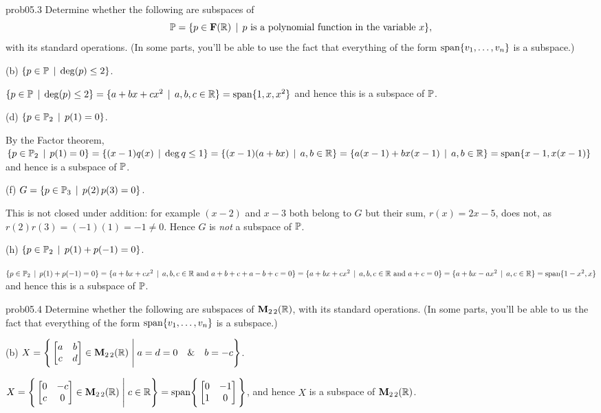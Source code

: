 \begin{sol}{prob05.3} Determine whether   the following are subspaces of $$\mathbb{P} =\{p \in \mathbf{F}(\mathbb{R})   \,\mid \, p \text{ is a polynomial function in the variable } x \},$$ with its standard operations. (In some parts, you'll be able to use the fact that everything of the form $\textrm{span}\{v_1, \dots, v_n\}$  is a subspace.)
 
\medskip
 

(b) $\{p \in \mathbb{P}   \,\mid \, \deg(p)
\le 2  \}$. 

\soln $\{p \in \mathbb{P}   \,\mid \, \deg(p)
\le 2  \}= \{a +bx +cx^2   \,\mid \, a,b,c\in \mathbb{R} \}=\textrm{span}\{1, x, x^2\}$  and hence this is a subspace of $\mathbb{P}$.\medskip 
% 

 
 

(d)  $ \{p \in \mathbb{P}_2 \,\mid \,  p(1)=0 \}$. 

\soln By the Factor theorem, $ \{p \in \mathbb{P}_2 \,\mid \,  p(1)=0 \}=\{(x-1)q(x)\,\mid \, \deg q \le 1 \}=\{(x-1)(a+bx) \,\mid \, a,b \in \mathbb{R} \}=\{a(x-1)+ bx(x-1) \,\mid \, a,b \in \mathbb{R} \}=\textrm{span}\{x-1, x(x-1)\}$ and hence is  a subspace of $\mathbb{P}$. \medskip
%



(f) $G=\{p \in \mathbb{P}_3 \,\mid \,  p(2)\,p(3)=0 \}$. 

\soln This is not closed under addition: for example $(x-2)$ and $x-3$ both belong to $G$ but their sum, $r(x)=2x-5$, does not, as $r(2)r(3)=(-1)(1)=-1\not=0$. Hence $G$ is {\it not}  a subspace of $\mathbb{P}$.\medskip
%

(h) $ \{p \in \mathbb{P}_2 \,\mid \,  p(1)+p(-1)=0 \}$. 

\soln   $ \{p \in \mathbb{P}_2 \,\mid \,  p(1)+p(-1)=0 \}=\{a+bx +cx^2  \,\mid \,  a,b,c \in \mathbb{R} \text{ and } a+b+c+a-b+c=0 \}=\{a+bx +cx^2  \,\mid \,  a,b,c \in \mathbb{R} \text{ and } a+c=0 \}=\{a +bx -ax^2  \,\mid \,  a, c \in \mathbb{R} \}=\textrm{span}\{1- x^2, x\}$ and hence this is   a subspace of $\mathbb{P}$.\medskip
%

 
\end{sol}\begin{sol}{prob05.4} Determine whether   the following are subspaces of $\mathbf{M}_{2 \,2}(\mathbb{R})$, with its standard operations. (In some parts, you'll be able to us the fact that everything of the form $\textrm{span}\{v_1, \dots, v_n\}$  is a subspace.)

\medskip




(b)  $X=\Bigg\{  \bmatrix a&b\\ c&d\endbmatrix \in \M_{2 \,2}(\R) \;\Bigg|\;a=d=0\quad \&\quad b=-c  \Bigg\}$. 

\soln $X=\Bigg\{  \bmatrix 0&-c\\ c&0\endbmatrix \in \M_{2 \,2}(\R) \;\Bigg|\;c\in \R \Bigg\}=\text{span}\Bigg\{ \bmatrix 0&-1\\ 1&0\endbmatrix\Bigg\}$, and hence $X$ is a subspace of $\mathbf{M}_{2 \,2}(\mathbb{R})$.\medskip
%


\end{sol}
